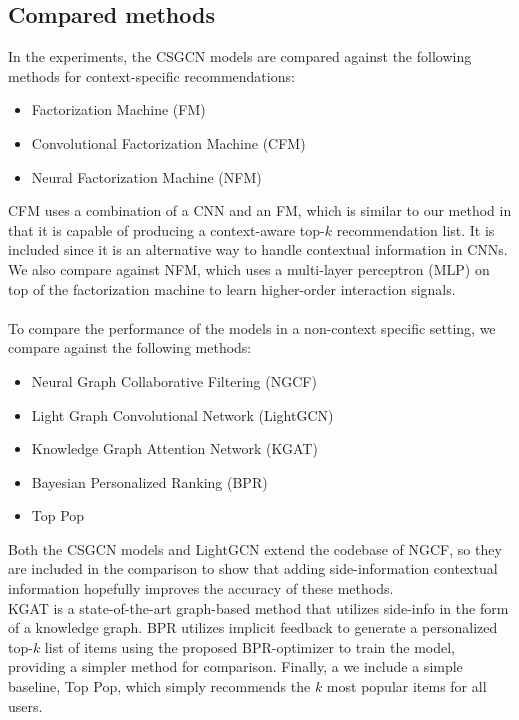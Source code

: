 \subsection{Compared methods}
In the experiments, the CSGCN models are compared against the following methods for context-specific recommendations:
\begin{itemize}
    \item Factorization Machine (FM)\cite{fmrendle}
    \item Convolutional Factorization Machine (CFM) \cite{CFM}
    \item Neural Factorization Machine (NFM) \cite{NeuralFM}
\end{itemize}
CFM uses a combination of a CNN and an FM, which is similar to our method in that it is capable of producing a context-aware top-$k$ recommendation list.
It is included since it is an alternative way to handle contextual information in CNNs.
We also compare against NFM, which uses a multi-layer perceptron (MLP) on top of the factorization machine to learn higher-order interaction signals.
\\\\
To compare the performance of the models in a non-context specific setting, we compare against the following methods:
\begin{itemize}
    \item Neural Graph Collaborative Filtering (NGCF) \cite{NGCF}
    \item Light Graph Convolutional Network (LightGCN) \cite{LightGCN}
    \item Knowledge Graph Attention Network (KGAT) \cite{KGAT}
    \item Bayesian Personalized Ranking (BPR) \cite{BPR}
    \item Top Pop
\end{itemize}
Both the CSGCN models and LightGCN extend the codebase of NGCF, so they are included in the comparison to show that adding side-information contextual information hopefully improves the accuracy of these methods.\\
KGAT is a state-of-the-art graph-based method that utilizes side-info in the form of a knowledge graph.
BPR utilizes implicit feedback to generate a personalized top-$k$ list of items using the proposed BPR-optimizer to train the model, providing a simpler method for comparison.
Finally, a we include a simple baseline, Top Pop, which simply recommends the $k$ most popular items for all users.

